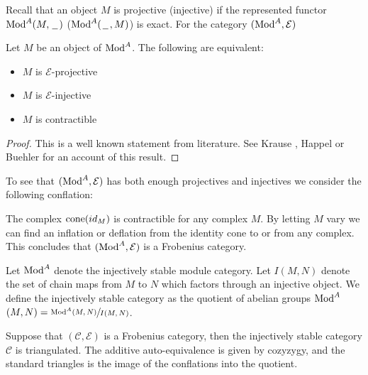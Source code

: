 \documentclass[../thesis.tex]{subfiles}
\begin{document}
            Recall that an object $M$ is projective (injective) if the represented functor $\tt{Mod}^A(M,\argument)$ ($\tt{Mod}^A(\argument,M)$) is exact. For the category $(\tt{Mod}^A, \mathcal{E})$

            \begin{proposition}
                Let $M$ be an object of $\tt{Mod}^A$. The following are equivalent:
                \begin{itemize}
                    \item $M$ is $\mathcal{E}$-projective
                    \item $M$ is $\mathcal{E}$-injective
                    \item $M$ is contractible
                \end{itemize}
            \end{proposition}

            \begin{proof}
                This is a well known statement from literature. See Krause \cite{Krause21}, Happel \cite{Happel88} or Buehler \cite{Buhler10} for an account of this result.
            \end{proof}

            To see that $(\tt{Mod}^A, \mathcal{E})$ has both enough projectives and injectives we consider the following conflation:

            \begin{center}
            \end{center}

            The complex $\tt{cone}(id_M)$ is contractible for any complex $M$. By letting $M$ vary we can find an inflation or deflation from the identity cone to or from any complex. This concludes that $(\tt{Mod}^A, \mathcal{E})$ is a Frobenius category.
            
            Let \underline{$\tt{Mod}^A$} denote the injectively stable module category. Let $I(M,N)$ denote the set of chain maps from $M$ to $N$ which factors through an injective object. We define the injectively stable category as the quotient of abelian groups \underline{$\tt{Mod}^A$}$(M,N)=\sfrac{\tt{Mod}^A(M,N)}{I(M,N)}$.

            \begin{thm}
                Suppose that $(\mathcal{C},\mathcal{E})$ is a Frobenius category, then the injectively stable category \underline{$\mathcal{C}$} is triangulated. The additive auto-equivalence is given by cozyzygy, and the standard triangles is the image of the conflations into the quotient.
            \end{thm}
\end{document}
